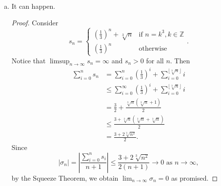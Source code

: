 \begin{Exercise}
\begin{enumerate}[(a)]
		\item
		\begin{answer}
			It can happen.
		\end{answer}
		\begin{proof}
			Consider
			$$
			s_n = \begin{cases}
			\left( \frac{1}{3} \right)^n + \sqrt[3]{n} & \mbox{if } n=k^3, k\in\mathbb{Z} \\
			\left( \frac{1}{3} \right)^n & \mbox{otherwise}
			\end{cases}.
			$$
			Notice that $\limsup_{n\to\infty} s_n = \infty$ and $s_n>0$ for all $n$. 
			Then
			\begin{align*}
			\sum_{i=0}^{n}s_n
			&= \sum_{i=0}^{n} \left( \frac{1}{3} \right)^i + \sum_{i=0}^{\lfloor \sqrt[3]{n} \rfloor}i \\
			&\leq \sum_{i=0}^{\infty} \left( \frac{1}{3} \right)^i + \sum_{i=0}^{\lfloor \sqrt[3]{n} \rfloor}i \\
			&= \frac{3}{2} + \frac{\sqrt[3]{n}(\sqrt[3]{n}+1)}{2} \\
			&\leq \frac{3+\sqrt[3]{n}(\sqrt[3]{n}+\sqrt[3]{n})}{2} \\
			&= \frac{3+2\sqrt[3]{n^2}}{2}.
			\end{align*}
			Since
			$$
			|\sigma_n|
			= \left| \frac{\sum_{i=0}^{n}s_i}{n+1} \right|
			\leq \frac{3+2\sqrt[3]{n^2}}{2(n+1)} \to 0\text{ as } n\to\infty,
			$$
			by the Squeeze Theorem, we obtain $\lim_{n\to\infty} \sigma_n = 0$ as promised.
		\end{proof}
	\end{enumerate}
\end{Exercise}